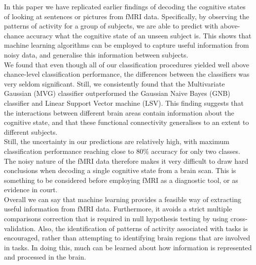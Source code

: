 \documentclass[preprint,journal,11pt]{vgtc}
\begin{document}
In this paper we have replicated earlier findings of decoding the cognitive states of looking at sentences or pictures from fMRI data. Specifically, by observing the patterns of activity for a group of subjects, we are able to predict with above-chance accuracy what the cognitive state of an unseen subject is. This shows that machine learning algorithms can be employed to capture useful information from noisy data, and generalise this information between subjects.\\
\indent We found that even though all of our classification procedures yielded well above chance-level classification performance, the differences between the classifiers was very seldom significant. Still, we consistently found that the Multivariate Gaussian (MVG) classifier outperformed the Gaussian Naive Bayes (GNB) classifier and Linear Support Vector machine (LSV). This finding suggests that the interactions between different brain areas contain information about the cognitive state, and that these functional connectivity generalises to an extent to different subjects.\\
\indent Still, the uncertainty in our predictions are relatively high, with maximum classification performance reaching close to 80\% accuracy for only two classes. The noisy nature of the fMRI data therefore makes it very difficult to draw hard conclusions when decoding a single cognitive state from a brain scan. This is something to be considered before employing fMRI as a diagnostic tool, or as evidence in court.\\
\indent Overall we can say that machine learning provides a feasible way of extracting useful information from fMRI data. Furthermore, it avoids a strict multiple comparisons correction that is required in null hypothesis testing by using cross-validation. Also, the identification of patterns of activity associated with tasks is encouraged, rather than attempting to identifying brain regions that are involved in tasks. In doing this, much can be learned about how information is represented and processed in the brain.




\end{document}
